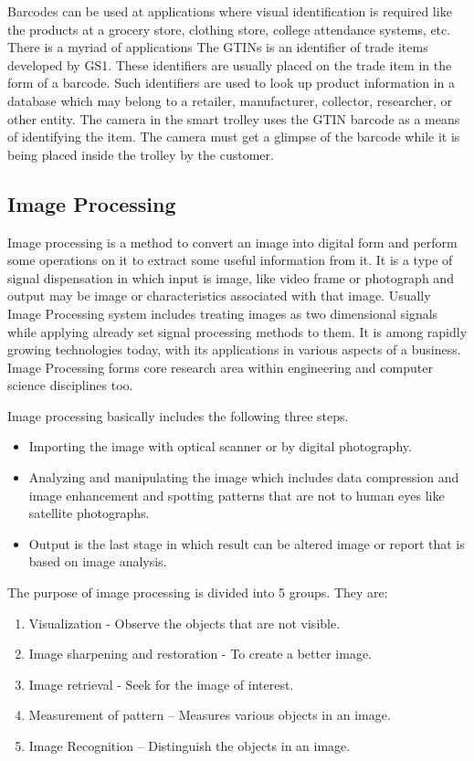 \documentclass[times, 1pt, a4paper]{article}
\begin{document}
Barcodes can be used at applications where visual identification is required like the products at a grocery store, clothing store, college attendance systems, etc. There is a myriad of applications
The GTINs is an identifier of trade items developed by GS1. These identifiers are usually placed on the trade item in the form of a barcode. Such identifiers are used to look up product information in a database which may belong to a retailer, manufacturer, collector, researcher, or other entity. 
The camera in the smart trolley uses the GTIN barcode as a means of identifying the item. The camera must get a glimpse of the barcode while it is being placed inside the trolley by the customer. 


\subsection*{Image Processing} \label{subsection:image_processing}

Image processing is a method to convert an image into digital form and perform some operations on it to extract some useful information from it. It is a type of signal dispensation in which input is image, like video frame or photograph and output may be image or characteristics associated with that image. Usually Image Processing system includes treating images as two dimensional signals while applying already set signal processing methods to them. 
It is among rapidly growing technologies today, with its applications in various aspects of a business. Image Processing forms core research area within engineering and computer science disciplines too.

Image processing basically includes the following three steps.

\begin{itemize}
\item Importing the image with optical scanner or by digital photography.
\item Analyzing and manipulating the image which includes data compression and image enhancement and spotting patterns that are not to human eyes like satellite photographs.
\item Output is the last stage in which result can be altered image or report that is based on image analysis.
\end{itemize}


The purpose of image processing is divided into 5 groups. They are:

\begin{enumerate}
\item Visualization - Observe the objects that are not visible.
\item Image sharpening and restoration - To create a better image.
\item Image retrieval - Seek for the image of interest.
\item Measurement of pattern – Measures various objects in an image.
\item Image Recognition – Distinguish the objects in an image.

\end{enumerate}
     
\end{document}

